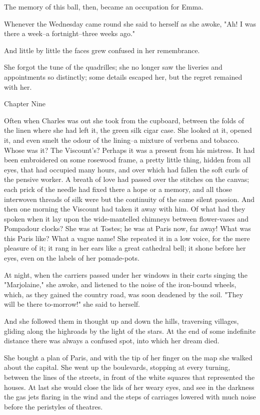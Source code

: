 \documentclass[11pt,twocolumn]{ltugboat}
\begin{document}
The memory of this ball, then, became an occupation for Emma.

Whenever the Wednesday came round she said to herself as she awoke, "Ah!
I was there a week--a fortnight--three weeks ago."

And little by little the faces grew confused in her remembrance.

She forgot the tune of the quadrilles; she no longer saw the liveries
and appointments so distinctly; some details escaped her, but the regret
remained with her.



Chapter Nine

Often when Charles was out she took from the cupboard, between the
folds of the linen where she had left it, the green silk cigar case.
She looked at it, opened it, and even smelt the odour of the lining--a
mixture of verbena and tobacco. Whose was it? The Viscount's? Perhaps
it was a present from his mistress. It had been embroidered on some
rosewood frame, a pretty little thing, hidden from all eyes, that had
occupied many hours, and over which had fallen the soft curls of the
pensive worker. A breath of love had passed over the stitches on the
canvas; each prick of the needle had fixed there a hope or a memory, and
all those interwoven threads of silk were but the continuity of the same
silent passion. And then one morning the Viscount had taken it away
with him. Of what had they spoken when it lay upon the wide-mantelled
chimneys between flower-vases and Pompadour clocks? She was at Tostes;
he was at Paris now, far away! What was this Paris like? What a vague
name! She repeated it in a low voice, for the mere pleasure of it; it
rang in her ears like a great cathedral bell; it shone before her eyes,
even on the labels of her pomade-pots.

At night, when the carriers passed under her windows in their carts
singing the "Marjolaine," she awoke, and listened to the noise of the
iron-bound wheels, which, as they gained the country road, was soon
deadened by the soil. "They will be there to-morrow!" she said to
herself.

And she followed them in thought up and down the hills, traversing
villages, gliding along the highroads by the light of the stars. At the
end of some indefinite distance there was always a confused spot, into
which her dream died.

She bought a plan of Paris, and with the tip of her finger on the map
she walked about the capital. She went up the boulevards, stopping at
every turning, between the lines of the streets, in front of the white
squares that represented the houses. At last she would close the lids of
her weary eyes, and see in the darkness the gas jets flaring in the wind
and the steps of carriages lowered with much noise before the peristyles
of theatres.
\end{document}
